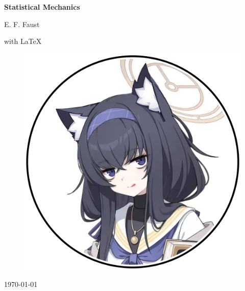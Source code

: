 \documentclass[../main.tex]{subfiles}
\begin{document}
\begin{titlepage}
    \begin{center}
        \vspace*{1.5cm}
        
        \Huge
        \textbf{Statistical Mechanics}
    
        \vspace{0.5cm}
        \Large
        {E. F. Faust} 

        \vspace{0.2cm}
        \large with \LaTeX
        
        \vfill
        \begin{figure}[h!]
            \centering
            \includegraphics[width=\textwidth]{../Cover/UIicon}
        \end{figure}
        \vfill
        \Large
        {\today}
        
    \end{center}
\end{titlepage}
\end{document}
